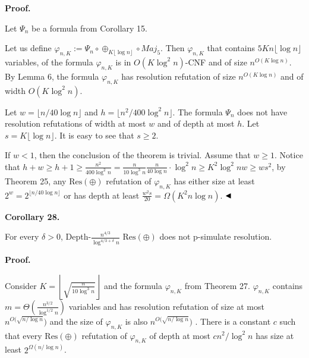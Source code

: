 \par\medskip\noindent\textbf{Proof.}\par


Let $\Psi_{n}$ be a formula from Corollary 15.\par



Let us define $\varphi_{n,K}:=\Psi_{n}\circ\oplus_{K\lfloor\log n\rfloor}\circ Maj_{5}$.
Then $\varphi_{n,K}$ that contains $5Kn\lfloor\log n\rfloor$ variables, of the formula
$\varphi_{n,K}$ is in $O(K\log^{2}n)$-CNF and of size $n^{O(K\log n)}$.
By Lemma 6, the formula $\varphi_{n,K}$ has resolution refutation of size $n^{O(K\log n)}$ and of width $O(K\log^{2}n)$.\par



Let $w=\lfloor n/40\log n\rfloor$ and $h=\lfloor n^{2}/400\log^{2}n\rfloor$.
The formula $\Psi_{n}$ does not have resolution refutations of width at most $w$ and of depth at most $h$.
Let $s=K\lfloor\log n\rfloor$. It is easy to see that $s\geq 2$.\par



If $w<1$, then the conclusion of the theorem is trivial. Assume that $w\geq 1$.
Notice that $h+w\geq h+1\geq\frac{n^{2}}{400\log^{2}n}=\frac{n}{10\log^{3}n}\frac{n}{40\log
n}\cdot\log^{2}n\geq K^{2}\log^{2}nw\geq ws^{2}$, by Theorem 25, any $\mathrm{Res}(\oplus)$ refutation of $\varphi_{n,K}$ has either
size at least $2^{w}=2^{\lfloor n/40\log n\rfloor}$ or has depth at least $\frac{w^{2}s}{20}=\Omega(K^{2}n\log n)$.
$\hfill\blacktriangleleft$\par



\par\medskip\noindent\textbf{
Corollary 28.
}\par



For every $\delta>0$,
Depth-$\frac{n^{4/3}}{\log^{4/3+\delta}n}$ $\mathrm{Res}(\oplus)$ does not p-simulate resolution.\par



\par\medskip\noindent\textbf{Proof.}\par


Consider $K=\left\lfloor\sqrt{\frac{n}{10\log^{3}n}}\right\rfloor$ and the formula $\varphi_{n,K}$ from Theorem 27.
$\varphi_{n,K}$ contains
$m=\Theta\left(\frac{n^{3/2}}{\log^{1/2}n}\right)$ variables and
has resolution refutation of size at most $n^{O(\sqrt{n/\log n}})$ and the size of $\varphi_{n,K}$ is also $n^{O(\sqrt{n/\log n}})$ .
There is a constant $c$ such that every $\mathrm{Res}(\oplus)$ refutation of $\varphi_{n,K}$ of depth at most $cn^{2}/\log^{2}n$ has size at least $2^{\Omega\left(n/\log n\right)}$.\par



